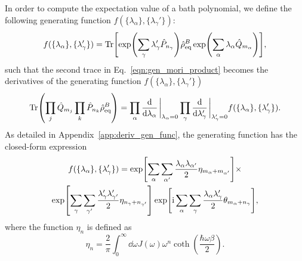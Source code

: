 \documentclass[preprint,aip,jcp]{revtex4-2}
\newcommand{\im}{\textup{i}}
\begin{document}
In order to compute the expectation value of a bath polynomial, we define the following generating function $f(\{\lambda_{\alpha}\}, \{\lambda_{\gamma}'\})$:
\begin{equation}
    f(\{\lambda_{\alpha}\}, \{\lambda_{\gamma}'\}) = \Tr[\exp(\sum_{\gamma} \lambda'_{\gamma} \hat{P}_{n_{\gamma}}) \hat{\rho}_\text{eq}^{B} \exp(\sum_{\alpha} \lambda_{\alpha} \hat{Q}_{m_{\alpha}})],\label{eqn:def_gen_func}
\end{equation}
such that the second trace in Eq.~\ref{eqn:gen_mori_product} becomes the derivatives of the generating function $f(\{\lambda_{\alpha}\}, \{\lambda_{\gamma}'\})$
\begin{equation}
    \Tr(\prod_{j} \hat{Q}_{m_j} \prod_{k} \hat{P}_{n_k} \hat{\rho}_\text{eq}^{B}) = \prod_{\alpha} \dv{}{\lambda_{\alpha}} \eval_{\lambda_{\alpha}=0} \prod_{\gamma} \dv{}{\lambda_{\gamma}'} \eval_{\lambda_{\gamma}'=0} f(\{\lambda_{\alpha}\}, \{\lambda_{\gamma}'\}).
\end{equation}
As detailed in Appendix~\ref{app:deriv_gen_func}, the generating function has the closed-form expression
\begin{multline}\label{eqn:expval_gen_func}
    f(\{\lambda_{\alpha}\}, \{\lambda_{\gamma}'\}) = \exp[\sum_{\alpha} \sum_{\alpha'} \frac{\lambda_{\alpha} \lambda_{\alpha'}}{2} \eta_{m_{\alpha} + m_{\alpha'}}] \times \\
    \exp[\sum_{\gamma} \sum_{\gamma'}  \frac{\lambda_{\gamma}' \lambda_{\gamma'}'}{2} \eta_{n_{\gamma} + n_{\gamma'}}] \exp[\im \sum_{\alpha} \sum_{\gamma}  \frac{\lambda_{\alpha} \lambda_{\gamma}'}{2} \theta_{m_{\alpha} + n_{\gamma}}],
\end{multline}
where the function $\eta_n$ is defined as
\begin{equation}\label{eqn:eta}
    \eta_{n} = \frac{2}{\pi} \int_{0}^{\infty} \dd{\omega} J(\omega) \omega^{n} \coth(\frac{\hbar\omega\beta}{2}) .
\end{equation}
\end{document}
